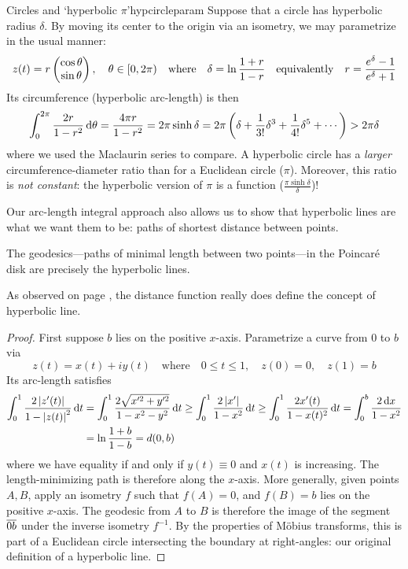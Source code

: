 	
\begin{example}{Circles and `hyperbolic $\pi$'}{hypcircleparam}
	Suppose that a circle has hyperbolic radius $\delta$. By moving its center to the origin via an isometry, we may parametrize in the usual manner:
	\[
		z(t)=r\begin{pmatrix}\cos\theta\\\sin\theta\end{pmatrix},\quad \theta\in[0,2\pi)
		\quad\text{where}\quad 
		\delta=\ln\frac{1+r}{1-r}
		\quad\text{equivalently}\quad
		r=\frac{e^\delta-1}{e^\delta+1}
	\]
	Its circumference (hyperbolic arc-length) is then
	\[
		\int_0^{2\pi}\frac{2 r}{1-r^2}\,{\mathrm{d}\theta} =\frac{4\pi r}{1-r^2} =2\pi\sinh\delta =2\pi\left(\delta+\frac{1}{3!}\delta^3+\frac{1}{4!}\delta^5+\cdots\right)>2\pi\delta
	\]
	where we used the Maclaurin series to compare.\smallbreak
	A hyperbolic circle has a \emph{larger} circumference-diameter ratio than for a Euclidean circle ($\pi$). Moreover, this ratio is \emph{not constant}: the hyperbolic version of $\pi$ is a function ($\frac{\pi\sinh\delta}\delta$)!
\end{example}


	
Our arc-length integral approach also allows us to show that hyperbolic lines are what we want them to be: paths of shortest distance between points.
	
\begin{thm}{}{}
	The geodesics---paths of minimal length between two points---in the Poincaré disk are precisely the hyperbolic lines.
\end{thm}

As observed on page \pageref{sec:hyperiso}, the distance function really does define the concept of hyperbolic line.

\begin{proof}
	First suppose $b$ lies on the positive $x$-axis. Parametrize a curve from $0$ to $b$ via
	\[
		z(t)=x(t)+iy(t)
		\quad\text{where}\quad 
		0\le t\le 1,\quad z(0)=0,\quad z(1)=b
	\]
	Its arc-length satisfies
	\begin{align*}
		\int_{0}^{1}\frac{2\left| z'(t)\right|}{1-\left| z(t)\right|^2}\,{\mathrm{d} t}
		&=\int_{0}^{1}\frac{2\sqrt{x'^2+y'^2}}{1-x^2-y^2}\,{\mathrm{d} t}\ge \int_{0}^{1}\frac{2\left| x'\right|}{1-x^2}\,{\mathrm{d} t}\ge \int_{0}^{1}\frac{2x'(t)}{1-x(t)^2}\,{\mathrm{d} t} =\int_0^b\frac{2\,{\mathrm{d} x}}{1-x^2}\\
		&=\ln\frac{1+b}{1-b}=d(0,b)
	\end{align*}
	where we have equality if and only if $y(t)\equiv 0$ and $x(t)$ is increasing. The length-minimizing path is therefore along the $x$-axis.\smallbreak
	More generally, given points $A,B$, apply an isometry $f$ such that $f(A)=0$, and $f(B)=b$ lies on the positive $x$-axis. The geodesic from $A$ to $B$ is therefore the image of the segment $\overline{0b}$ under the inverse isometry $f^{-1}$. By the properties of Möbius transforms, this is part of a Euclidean circle intersecting the boundary at right-angles: our original definition of a hyperbolic line.
\end{proof}


